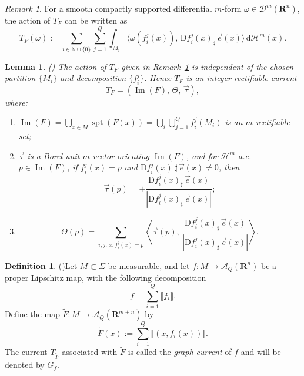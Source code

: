 \documentclass[a4paper,twoside,reqno]{article}
\theoremstyle{definition}
\theoremstyle{remark}
\theoremstyle{plain}
\newtheorem{lemma}[theorem]{Lemma}
\theoremstyle{remark}
\newtheorem{remark}[theorem]{Remark}
\theoremstyle{definition}
\newtheorem{definition}[theorem]{Definition}
\newcommand{\natp}{\mathbb{N}}
\newcommand{\nat}{\natp \cup \{0\}}
\newcommand{\R}{\mathbf{R}}
\newcommand{\HM}{\mathscr{H}}
\newcommand{\ud}{\ensuremath{\,\mathrm{d}}}
\newcommand{\uD}{\ensuremath{\mathrm{D}}}
\newcommand{\qspace}[1]{\mathcal{A}_{{#1}}}
\begin{document}
\begin{remark}\label{rem:action_of_T}
    For a smooth compactly supported differential $m$-form 
    $\omega \in \mathcal{D}^m(\R^n)$, the action of $T_F$ can be 
    written as
    \[
        T_F(\omega)
        := 
        \sum_{i\in\nat} \sum_{j=1}^Q \int_{M_i}
        \langle \omega(f_i^j(x)),\, \uD f_i^j(x)_\sharp\, \vec e(x) \rangle
        \ud \HM^m(x).
    \]
\end{remark}

\begin{lemma}(\cite[1.4]{delellis2013multiplevaluedfunctionsintegral})
\label{prop:1.4}
The action of $T_F$ given in Remark~\ref{rem:action_of_T} is independent of the
chosen partition $\{M_i\}$ and decomposition $\{f_i^j\}$.
Hence $T_F$ is an integer rectifiable current
\[
    T_F = (\operatorname{Im}(F),\, \Theta,\, \vec \tau),
\]
where:
\begin{enumerate}
    \item
        $\operatorname{Im}(F)
        = \bigcup_{x\in M} \operatorname{spt}(F(x))
        = \bigcup_i \bigcup_{j=1}^Q f_i^j(M_i)$
        is an $m$-rectifiable set;

    \item
        $\vec \tau$ is a Borel unit $m$-vector orienting $\operatorname{Im}(F)$, and for
        $\HM^m$-a.e.\ $p \in \operatorname{Im}(F)$,
        if $f_i^j(x) = p$ and $\uD f_i^j(x)\,\sharp\,\vec e(x) \neq 0$, then
        \[
            \vec \tau(p)
            = \pm \frac{\uD f_i^j(x)_\sharp\, \vec e(x)}
            {|\uD f_i^j(x)_\sharp\, \vec e(x)|};
        \]

    \item
        \[\Theta(p)
            = \sum_{i,j,\,x: f_i^j(x)=p}
            \left\langle
            \vec \tau(p),\,
            \frac{\uD f_i^j(x)_\sharp\, \vec e(x)}
            {|\uD f_i^j(x)_\sharp\, \vec e(x)|}
            \right\rangle .
        \]
    \end{enumerate}
\end{lemma}

\begin{definition}(\cite[1.10]{delellis2013multiplevaluedfunctionsintegral})\label{def:Q-graphs}
    Let $M \subset \Sigma$ be measurable, and let $f \colon M \to \mathcal A_Q(\R^n)$ 
    be a proper Lipschitz map, with the following decomposition
    \[
        f = \sum_{i=1}^Q \llbracket f_i \rrbracket.
    \]
    Define the map $\tilde{F} \colon M \to \qspace{Q}(\R^{m+n})$ by
    \[
        \tilde{F}(x) := \sum_{i=1}^Q \llbracket (x, f_i(x)) \rrbracket.
    \]
    The current $T_{\tilde{F}}$ associated with $\tilde{F}$ is called the \emph{graph current} of 
    $f$ and will be denoted by $G_f$.
\end{definition}
\end{document}

